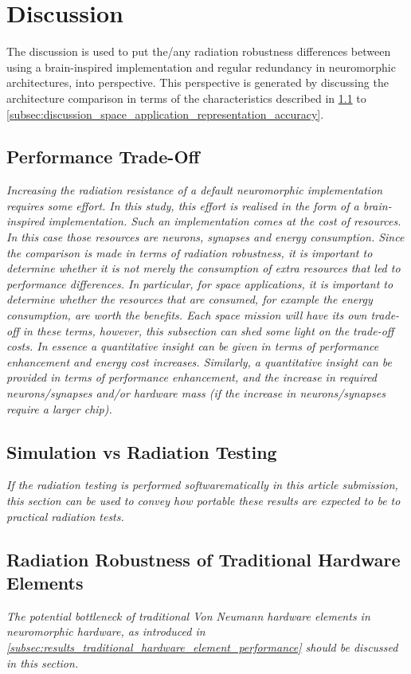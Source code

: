 \section{Discussion}\label{sec:discussion}
The discussion is used to put the/any radiation robustness differences between using a brain-inspired implementation and regular redundancy in neuromorphic architectures, into perspective. This perspective is generated by discussing the architecture comparison in terms of the characteristics described in \cref{subsec:discussion_performance_trade_off} to \cref{subsec:discussion_space_application_representation_accuracy}.

\subsection{Performance Trade-Off}\label{subsec:discussion_performance_trade_off}
\textit{Increasing the radiation resistance of a default neuromorphic implementation requires some effort. In this study, this effort is realised in the form of a brain-inspired implementation. Such an implementation comes at the cost of resources. In this case those resources are neurons, synapses and energy consumption. Since the comparison is made in terms of radiation robustness, it is important to determine whether it is not merely the consumption of extra resources that led to performance differences. In particular, for space applications, it is important to determine whether the resources that are consumed, for example the energy consumption, are worth the benefits. Each space mission will have its own trade-off in these terms, however, this subsection can shed some light on the trade-off costs. In essence a quantitative insight can be given in terms of performance enhancement and energy cost increases. Similarly, a quantitative insight can be provided in terms of performance enhancement, and the increase in required neurons/synapses and/or hardware mass (if the increase in neurons/synapses require a larger chip).}

\subsection{Simulation vs Radiation Testing}
\textit{If the radiation testing is performed softwarematically in this article submission, this section can be used to convey how portable these results are expected to be to practical radiation tests.}

\subsection{Radiation Robustness of Traditional Hardware Elements}
\textit{The potential bottleneck of traditional Von Neumann hardware elements in neuromorphic hardware, as introduced in \cref{subsec:results_traditional_hardware_element_performance} should be discussed in this section.}

